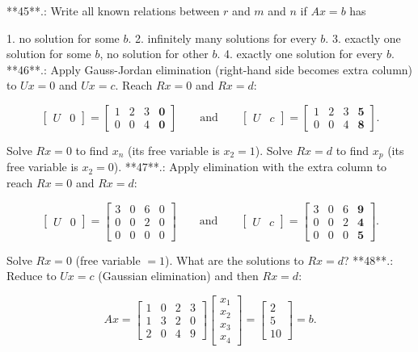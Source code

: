 

**45**.: Write all known relations between \(r\) and \(m\) and \(n\) if \(Ax=b\) has

1. no solution for some \(b\).
2. infinitely many solutions for every \(b\).
3. exactly one solution for some \(b\), no solution for other \(b\).
4. exactly one solution for every \(b\).
**46**.: Apply Gauss-Jordan elimination (right-hand side becomes extra column) to \(Ux=0\) and \(Ux=c\). Reach \(Rx=0\) and \(Rx=d\):

\[\begin{bmatrix}U&0\end{bmatrix}=\begin{bmatrix}1&2&3&\mathbf{0}\\ 0&0&4&\mathbf{0}\end{bmatrix}\qquad\text{and}\qquad\begin{bmatrix}U&c\end{bmatrix}= \begin{bmatrix}1&2&3&\mathbf{5}\\ 0&0&4&\mathbf{8}\end{bmatrix}.\]

Solve \(Rx=0\) to find \(x_{n}\) (its free variable is \(x_{2}=1\)). Solve \(Rx=d\) to find \(x_{p}\) (its free variable is \(x_{2}=0\)).
**47**.: Apply elimination with the extra column to reach \(Rx=0\) and \(Rx=d\):

\[\begin{bmatrix}U&0\end{bmatrix}=\begin{bmatrix}3&0&6&0\\ 0&0&2&0\\ 0&0&0&0\end{bmatrix}\qquad\text{and}\qquad\begin{bmatrix}U&c\end{bmatrix}= \begin{bmatrix}3&0&6&\mathbf{9}\\ 0&0&2&\mathbf{4}\\ 0&0&0&\mathbf{5}\end{bmatrix}.\]

Solve \(Rx=0\) (free variable \(=1\)). What are the solutions to \(Rx=d\)?
**48**.: Reduce to \(Ux=c\) (Gaussian elimination) and then \(Rx=d\):

\[Ax=\begin{bmatrix}1&0&2&3\\ 1&3&2&0\\ 2&0&4&9\end{bmatrix}\begin{bmatrix}x_{1}\\ x_{2}\\ x_{3}\\ x_{4}\end{bmatrix}=\begin{bmatrix}2\\ 5\\ 10\end{bmatrix}=b.\]


